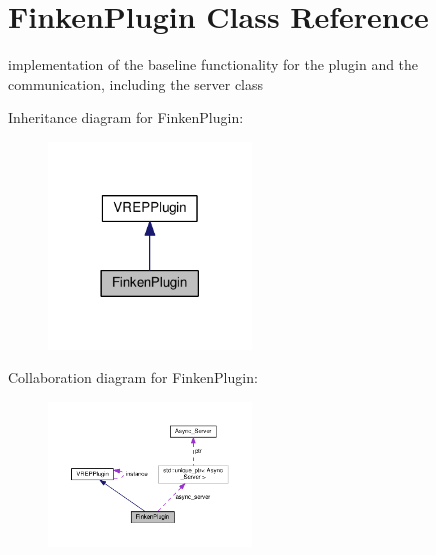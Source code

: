 \hypertarget{classFinkenPlugin}{}\section{Finken\+Plugin Class Reference}
\label{classFinkenPlugin}


implementation of the baseline functionality for the plugin and the communication, including the server class  




Inheritance diagram for Finken\+Plugin\+:\nopagebreak
\begin{figure}[H]
\begin{center}
\leavevmode
\includegraphics[width=153pt]{classFinkenPlugin__inherit__graph}
\end{center}
\end{figure}


Collaboration diagram for Finken\+Plugin\+:\nopagebreak
\begin{figure}[H]
\begin{center}
\leavevmode
\includegraphics[width=153pt]{classFinkenPlugin__coll__graph}
\end{center}
\end{figure}
